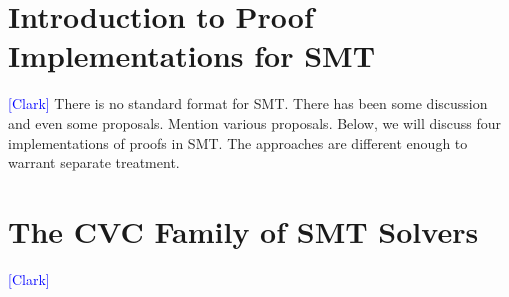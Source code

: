 \documentclass{llncs}
\newcommand{\Note}[1]{\textcolor{blue}{[#1]}}
\begin{document}








\section{Introduction to Proof Implementations for SMT}

\Note{Clark}
There is no standard format for SMT.  There has been some discussion and even
some proposals.  Mention various proposals.  Below, we will discuss four
implementations of proofs in SMT.  The approaches are different enough to
warrant separate treatment.

\section{The CVC Family of SMT Solvers}
\Note{Clark}
\end{document}
